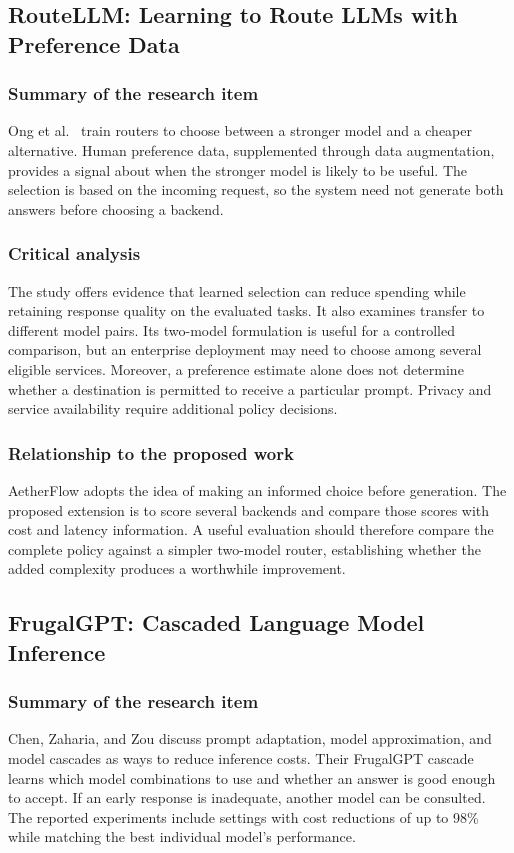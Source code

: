 \subsection{RouteLLM: Learning to Route LLMs with Preference Data}
\subsubsection{Summary of the research item}
Ong et al.\ \cite{ref:RouteLLM} train routers to choose between a stronger model and a cheaper alternative. Human preference data, supplemented through data augmentation, provides a signal about when the stronger model is likely to be useful. The selection is based on the incoming request, so the system need not generate both answers before choosing a backend.

\subsubsection{Critical analysis}
The study offers evidence that learned selection can reduce spending while retaining response quality on the evaluated tasks. It also examines transfer to different model pairs. Its two-model formulation is useful for a controlled comparison, but an enterprise deployment may need to choose among several eligible services. Moreover, a preference estimate alone does not determine whether a destination is permitted to receive a particular prompt. Privacy and service availability require additional policy decisions.

\subsubsection{Relationship to the proposed work}
AetherFlow adopts the idea of making an informed choice before generation. The proposed extension is to score several backends and compare those scores with cost and latency information. A useful evaluation should therefore compare the complete policy against a simpler two-model router, establishing whether the added complexity produces a worthwhile improvement.

\subsection{FrugalGPT: Cascaded Language Model Inference}
\subsubsection{Summary of the research item}
Chen, Zaharia, and Zou \cite{ref:FrugalGPT} discuss prompt adaptation, model approximation, and model cascades as ways to reduce inference costs. Their FrugalGPT cascade learns which model combinations to use and whether an answer is good enough to accept. If an early response is inadequate, another model can be consulted. The reported experiments include settings with cost reductions of up to 98\% while matching the best individual model's performance.

